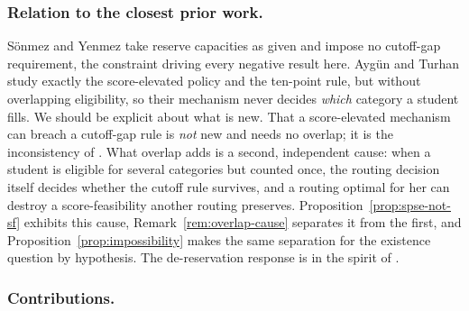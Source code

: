 \documentclass[a4paper,twoside]{article}
\theoremstyle{definition}
\begin{document}
\subsubsection{Relation to the closest prior work.}
S\"onmez and Yenmez \cite{SoYe20a,SoYe22a} take reserve capacities as given and impose no cutoff-gap requirement, the constraint driving every negative result here. Ayg\"un and Turhan \cite{AyTu23b} study exactly the score-elevated policy and the ten-point rule, but without overlapping eligibility, so their mechanism never decides \emph{which} category a student fills. We should be explicit about what is new. That a score-elevated mechanism can breach a cutoff-gap rule is \emph{not} new and needs no overlap; it is the inconsistency of \cite{AyTu23b}. What overlap adds is a second, independent cause: when a student is eligible for several categories but counted once, the routing decision itself decides whether the cutoff rule survives, and a routing optimal for her can destroy a score-feasibility another routing preserves. Proposition~\ref{prop:spse-not-sf} exhibits this cause, Remark~\ref{rem:overlap-cause} separates it from the first, and Proposition~\ref{prop:impossibility} makes the same separation for the existence question by hypothesis. The de-reservation response is in the spirit of \cite{AyTu23a}.

\subsubsection{Contributions.}

\end{document}
